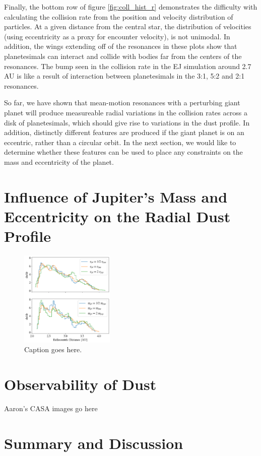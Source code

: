 \documentclass[onecolumn]{aastex63}
\begin{document}
Finally, the bottom row of figure \ref{fig:coll_hist_r} demonstrates the difficulty with calculating the collision rate from the position and velocity 
distribution of particles. At a given distance from the central star, the distribution of velocities (using eccentricity as a proxy for encounter 
velocity), is not unimodal. In addition, the wings extending off of the resonances in these plots show that planetesimals can interact and collide 
with bodies far from the centers of the resonances. The bump seen in the collision rate in the EJ simulation around 2.7 AU is like a result of interaction between planetesimals in the 3:1, 5:2 and 2:1 resonances.

So far, we have shown that mean-motion resonances with a perturbing giant planet will produce measureable radial variations in the collision rates across a disk of planetesimals, which should give rise to variations in the dust profile. In addition, distinctly different features are produced if the giant planet is on an eccentric, rather than a circular orbit. In the next section, we would like to determine whether these features can be used to place any constraints on the mass and eccentricity of the planet.

\section{Influence of Jupiter's Mass and Eccentricity on the Radial Dust Profile}

\begin{figure}
    \includegraphics[width=0.4\textwidth]{figures/coll_hist_e_and_m.png}
    \caption{Caption goes here.\label{fig:coll_hist_e_and_m}}
\end{figure}

\section{Observability of Dust} \label{sec:dust}

Aaron's CASA images go here

\section{Summary and Discussion} \label{sec:discuss}



\clearpage
\end{document}
